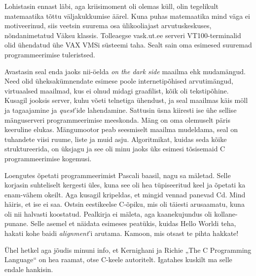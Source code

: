 Lohistasin ennast läbi, aga kriisimoment oli olemas 
küll, olin tegelikult matemaatika tõttu väljakukkumise äärel. Kuna puhas matemaatika mind väga ei motiveerinud, siis veetsin suurema osa 
ülikooliajast 
arvutuskeskuses, 
nõndanimetatud Väksu klassis\label{sisu:vase_klass}. Tolleaegse 
vask.ut.ee serveri VT100-terminalid olid ühendatud ühe 
VAX VMSi süsteemi taha. Sealt sain oma esimesed suuremad 
programmeerimise tuleristsed. 

Avastasin seal enda jaoks 
nii-öelda \emph{on the dark side} maailma ehk
mudamängud. Need olid üheksakümnendate 
esimese poole internetipõhised arvutimängud, virtuaalsed maailmad, kus ei olnud 
midagi graafilist, kõik oli tekstipõhine. Kusagil jooksis server, 
kuhu võeti telnetiga ühendust, ja seal maailmas käis möll ja 
tagaajamine ja \emph{quest}'ide lahendamine. Sattusin üsna kiiresti ise ühe sellise mänguserveri 
programmeerimise meeskonda. Mäng on oma 
olemuselt päris keeruline elukas. Mängumootor peab 
seesmiselt maailma mudeldama, seal on tuhandete viisi 
ruume, liste ja muid asju. Algoritmikat, kuidas seda kõike 
struktureerida, on üksjagu ja see oli minu jaoks üks esimesi tõsisemaid 
C programmeerimise kogemusi. 


Loengutes õpetati programmeerimist Pascali baasil, 
nagu sa mäletad. Selle korjasin suhteliselt kergesti üles, kuna see oli 
hea tüpiseeritud keel ja õpetati ka enam-vähem okeilt. Aga kusagil kripeldas, et mingid vennad panevad Cd. Mind
häiris, et ise ei saa. Ostsin eestikeelse C-õpiku, mis oli 
täiesti arusaamatu, kuna oli nii halvasti koostatud. Pealkirja ei mäleta, aga kaanekujundus oli kollane-punane. Selle asemel et näidata esimeses peatükis, kuidas Hello 
Worldi teha, hakati kohe baidi \emph{alignment}'i 
arutama. Kamoon, mis otsast te pihta hakkate! 

Ühel hetkel aga 
jõudis minuni info, et Kernighani ja Richie „The C Programming 
Language“ on hea raamat, otse C-keele autoritelt. 
Igatahes kuskilt ma selle endale hankisin. 


